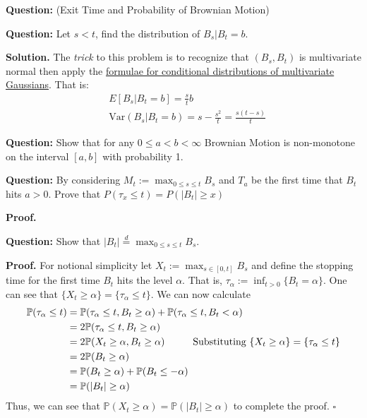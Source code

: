 \documentclass{article}
\begin{document}
\begin{tcolorbox}[colframe=black,colback=gray!5,boxrule=0.5pt]
\textbf{Question:} (Exit Time and Probability of Brownian Motion) 
\end{tcolorbox}

\begin{tcolorbox}[colframe=black,colback=gray!5,boxrule=0.5pt]
\textbf{Question:} Let $s < t$, find the distribution of $B_s | B_t = b$.
\end{tcolorbox}
\textbf{Solution.} The \textit{trick} to this problem is to recognize that $(B_s, B_t)$ is multivariate normal then apply the \href{https://online.stat.psu.edu/stat505/lesson/6/6.1}{formulae for conditional distributions of multivariate Gaussians}. That is: 
\begin{align*}
    & E[B_s | B_t=b] = \frac{s}{t}b \\
    &\text{Var}(B_s | B_t=b) = s-\frac{s^2}{t} = \frac{s(t-s)}{t}
\end{align*}

\begin{tcolorbox}[colframe=black,colback=gray!5,boxrule=0.5pt]
\textbf{Question:} Show that for any $0\leq a < b<\infty$ Brownian Motion is non-monotone on the interval $[a,b]$ with probability 1.  
\end{tcolorbox}


\begin{tcolorbox}[colframe=black,colback=gray!5,boxrule=0.5pt]
\textbf{Question:} By considering $M_t := \max_{0\leq s \leq t} B_s$ and $T_a$ be the first time that $B_t$ hits $a > 0$. Prove that $P(\tau_x\leq t) = P(|B_t|\geq x)$  
\end{tcolorbox}
\textbf{Proof.}

\begin{tcolorbox}[colframe=black,colback=gray!5,boxrule=0.5pt]
\textbf{Question:} Show that $|B_t| \stackrel{d}{=} \max_{0\leq s\leq t} B_s$.
\end{tcolorbox}
\textbf{Proof.} For notional simplicity let $X_t := \max_{s\in[0,t]} B_s$ and define the stopping time for the first time $B_t$ hits the level $\alpha$. That is, $\tau_\alpha := \inf_{t>0}\{B_t = \alpha\}$. One can see that $\{X_t\geq\alpha\} = \{\tau_\alpha \leq t\}$. We can now calculate
\begin{align*}
    \mathbb{P}(\tau_\alpha \leq t) &= \mathbb{P}(\tau_\alpha\leq t, B_t \geq \alpha) + \mathbb{P}(\tau_\alpha\leq t, B_t < \alpha) \\
    &= 2\mathbb{P}(\tau_\alpha\leq t, B_t \geq \alpha) \\
    &= 2\mathbb{P}(X_t\geq \alpha, B_t\geq \alpha) \hspace{10mm}\text{{Substituting $\{X_t\geq\alpha\} = \{\tau_\alpha \leq t\}$}} \\
    &= 2\mathbb{P}(B_t\geq \alpha) \\
    &= \mathbb{P}(B_t\geq \alpha) + \mathbb{P}(B_t\leq -\alpha) \\
    &=\mathbb{P}(|B_t|\geq\alpha)
\end{align*}
Thus, we can see that $\mathbb{P}(X_t\geq\alpha) = \mathbb{P}(|B_t|\geq\alpha)$ to complete the proof. $\square$
\end{document}
